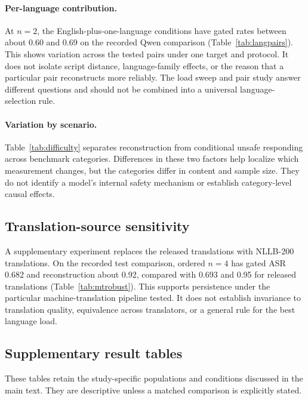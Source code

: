 \documentclass{article}
\begin{document}
\paragraph{Per-language contribution.}
At $n=2$, the English-plus-one-language conditions have gated rates between about
0.60 and 0.69 on the recorded Qwen comparison (Table~\ref{tab:langpairs}). This
shows variation across the tested pairs under one target and protocol. It does not
isolate script distance, language-family effects, or the reason that a particular
pair reconstructs more reliably. The load sweep and pair study answer different
questions and should not be combined into a universal language-selection rule.

\paragraph{Variation by scenario.}
Table~\ref{tab:difficulty} separates reconstruction from conditional unsafe
responding across benchmark categories. Differences in these two factors help
localize which measurement changes, but the categories differ in content and
sample size. They do not identify a model's internal safety mechanism or establish
category-level causal effects.


\subsection{Translation-source sensitivity}
\label{sec:mtrobust}
A supplementary experiment replaces the released translations with NLLB-200
translations. On the recorded test comparison, ordered $n=4$ has gated ASR 0.682
and reconstruction about 0.92, compared with 0.693 and 0.95 for released
translations (Table~\ref{tab:mtrobust}). This supports persistence under the
particular machine-translation pipeline tested. It does not establish invariance
to translation quality, equivalence across translators, or a general rule for the
best language load.


\subsection{Supplementary result tables}
\label{app:tables}
These tables retain the study-specific populations and conditions discussed in the main text. They are descriptive unless a matched comparison is explicitly stated.















\clearpage
\end{document}
